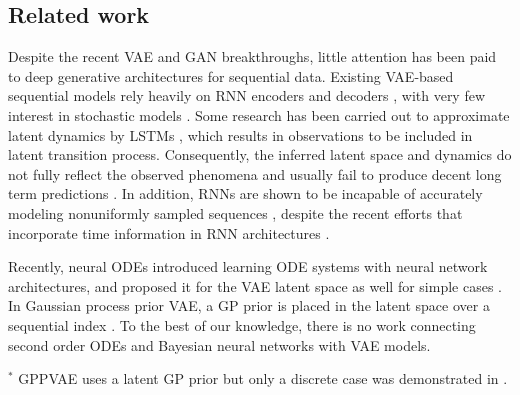 \documentclass{article}
\newcommand{\0}{\mathbf{0}}
\begin{document}
\subsection{Related work}
Despite the recent VAE and GAN breakthroughs, little attention has been paid to deep generative architectures for sequential data. Existing VAE-based sequential models rely heavily on RNN encoders and decoders \citep{chung2015recurrent,serban2017hierarchical}, with very few interest in stochastic models \citep{fraccaro2016sequential}. Some research has been carried out to approximate latent dynamics by LSTMs \citep{lotter2016deep,hsu2017unsupervised,li2018disentangled}, which results in observations to be included in latent transition process. Consequently, the inferred latent space and dynamics do not fully reflect the observed phenomena and usually fail to produce decent long term predictions \citep{karl2016deep}. In addition, RNNs are shown to be incapable of accurately modeling nonuniformly sampled sequences \citep{chen2018neural}, despite the recent efforts that incorporate time information in RNN architectures \citep{li2017time,xiao2018learning}.



Recently, neural ODEs introduced learning ODE systems with neural network architectures, and proposed it for the VAE latent space as well for simple cases \citep{chen2018neural}. In Gaussian process prior VAE, a GP prior is placed in the latent space over a sequential index \citep{casale2018gaussian}. To the best of our knowledge, there is no work connecting second order ODEs and Bayesian neural networks with VAE models.

\begin{table}[t]
    \centering
    \caption{Comparison of VAE-based models}
    ${}^*$ GPPVAE uses a latent GP prior but only a discrete case was demonstrated in \citet{casale2018gaussian}.
    \label{tab:comparison}
\end{table}
\end{document}

